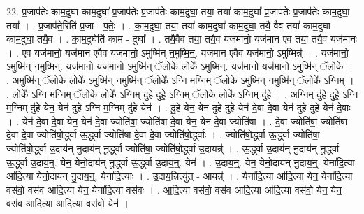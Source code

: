 \documentclass[17pt]{extarticle}
\begin{document}
22. प्र॒जाप॑तेः काम॒दुघा॑ काम॒दुघा᳚ प्र॒जाप॑तेः प्र॒जाप॑तेः काम॒दुघा॒ तया॒ तया॑ काम॒दुघा᳚ प्र॒जाप॑तेः प्र॒जाप॑तेः काम॒दुघा॒ तया᳚ । . प्र॒जाप॑ते॒रिति॑ प्र॒जा - प॒तेः॒ । . का॒म॒दुघा॒ तया॒ तया॑ काम॒दुघा॑ काम॒दुघा॒ तयै॒ वैव तया॑ काम॒दुघा॑ काम॒दुघा॒ तयै॒व । . का॒म॒दुघेति॑ काम - दुघा᳚ । . तयै॒वैव तया॒ तयै॒व यज॑मानो॒ यज॑मान ए॒व तया॒ तयै॒व यज॑मानः । . ए॒व यज॑मानो॒ यज॑मान ए॒वैव यज॑मानो॒ ऽमुष्मि॑न् न॒मुष्मि॒न्॒. यज॑मान ए॒वैव यज॑मानो॒ ऽमुष्मिन्न्॑ । . यज॑मानो॒ ऽमुष्मि॑न् न॒मुष्मि॒न्॒. यज॑मानो॒ यज॑मानो॒ ऽमुष्मि॑न् ॅलो॒के लो॒के॑ ऽमुष्मि॒न्॒. यज॑मानो॒ यज॑मानो॒ ऽमुष्मि॑न् ॅलो॒के । . अ॒मुष्मि॑न् ॅलो॒के लो॒के॑ ऽमुष्मि॑न् न॒मुष्मि॑न् ॅलो॒के᳚ ऽग्नि म॒ग्निम् ॅलो॒के॑ ऽमुष्मि॑न् न॒मुष्मि॑न् ॅलो॒के᳚ ऽग्निम् । . लो॒के᳚ ऽग्नि म॒ग्निम् ॅलो॒के लो॒के᳚ ऽग्निम् दु॑हे दुहे॒ ऽग्निम् ॅलो॒के लो॒के᳚ ऽग्निम् दु॑हे । . अ॒ग्निम् दु॑हे दुहे॒ ऽग्नि म॒ग्निम् दु॑हे॒ येन॒ येन॑ दुहे॒ ऽग्नि म॒ग्निम् दु॑हे॒ येन॑ । . दु॒हे॒ येन॒ येन॑ दुहे दुहे॒ येन॑ दे॒वा दे॒वा येन॑ दुहे दुहे॒ येन॑ दे॒वाः । . येन॑ दे॒वा दे॒वा येन॒ येन॑ दे॒वा ज्योति॑षा॒ ज्योति॑षा दे॒वा येन॒ येन॑ दे॒वा ज्योति॑षा । . दे॒वा ज्योति॑षा॒ ज्योति॑षा दे॒वा दे॒वा ज्योति॑षो॒र्द्ध्वा ऊ॒र्द्ध्वा ज्योति॑षा दे॒वा दे॒वा ज्योति॑षो॒र्द्ध्वाः । . ज्योति॑षो॒र्द्ध्वा ऊ॒र्द्ध्वा ज्योति॑षा॒ ज्योति॑षो॒र्द्ध्वा उ॒दाय॑न् नु॒दाय॑न् नू॒र्द्ध्वा ज्योति॑षा॒ ज्योति॑षो॒र्द्ध्वा उ॒दायन्न्॑ । . ऊ॒र्द्ध्वा उ॒दाय॑न् नु॒दाय॑न् नू॒र्द्ध्वा ऊ॒र्द्ध्वा उ॒दाय॒न्॒. येन॒ येनो॒दाय॑न् नू॒र्द्ध्वा ऊ॒र्द्ध्वा उ॒दाय॒न्॒. येन॑ । . उ॒दाय॒न्॒. येन॒ येनो॒दाय॑न् नु॒दाय॒न्॒. येना॑दि॒त्या आ॑दि॒त्या येनो॒दाय॑न् नु॒दाय॒न्॒. येना॑दि॒त्याः । . उ॒दाय॒न्नित्यु॑त् - आयन्न्॑ । . येना॑दि॒त्या आ॑दि॒त्या येन॒ येना॑दि॒त्या वस॑वो॒ वस॑व आदि॒त्या येन॒ येना॑दि॒त्या वस॑वः । . आ॒दि॒त्या वस॑वो॒ वस॑व आदि॒त्या आ॑दि॒त्या वस॑वो॒ येन॒ येन॒ वस॑व आदि॒त्या आ॑दि॒त्या वस॑वो॒ येन॑ । \newline
\end{document}
